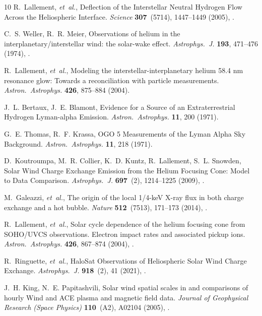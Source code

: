 \documentclass[12pt]{article}
\newcommand*\aap{Astron.~Astrophys.}
\newcommand*\apj{Astrophys.~J.}
\newcommand*\nat{Nature}
\begin{document}
\begin{thebibliography}{10}
R.~{Lallement}, \emph{et~al.}, {Deflection of the Interstellar Neutral Hydrogen
  Flow Across the Heliospheric Interface}. \emph{Science} \textbf{307}~(5714),
  1447--1449 (2005), .

C.~S. {Weller}, R.~R. {Meier}, {Observations of helium in the
  interplanetary/interstellar wind: the solar-wake effect.} \emph{\apj}
  \textbf{193}, 471--476 (1974), .

R.~{Lallement}, \emph{et~al.}, {Modeling the interstellar-interplanetary helium
  58.4 nm resonance glow: Towards a reconciliation with particle measurements.}
  \emph{\aap} \textbf{426}, 875--884 (2004).

J.~L. {Bertaux}, J.~E. {Blamont}, {Evidence for a Source of an Extraterrestrial
  Hydrogen Lyman-alpha Emission}. \emph{\aap} \textbf{11}, 200 (1971).

G.~E. {Thomas}, R.~F. {Krassa}, {OGO 5 Measurements of the Lyman Alpha Sky
  Background}. \emph{\aap} \textbf{11}, 218 (1971).

D.~{Koutroumpa}, M.~R. {Collier}, K.~D. {Kuntz}, R.~{Lallement}, S.~L.
  {Snowden}, {Solar Wind Charge Exchange Emission from the Helium Focusing
  Cone: Model to Data Comparison}. \emph{\apj} \textbf{697}~(2), 1214--1225
  (2009), .

M.~{Galeazzi}, \emph{et~al.}, {The origin of the local 1/4-keV X-ray flux in
  both charge exchange and a hot bubble}. \emph{\nat} \textbf{512}~(7513),
  171--173 (2014), .

R.~{Lallement}, \emph{et~al.}, {Solar cycle dependence of the helium focusing
  cone from SOHO/UVCS observations. Electron impact rates and associated pickup
  ions}. \emph{\aap} \textbf{426}, 867--874 (2004),
  .

R.~{Ringuette}, \emph{et~al.}, {HaloSat Observations of Heliospheric Solar Wind
  Charge Exchange}. \emph{\apj} \textbf{918}~(2), 41 (2021),
  .

J.~H. {King}, N.~E. {Papitashvili}, {Solar wind spatial scales in and
  comparisons of hourly Wind and ACE plasma and magnetic field data}.
  \emph{Journal of Geophysical Research (Space Physics)} \textbf{110}~(A2),
  A02104 (2005), .


\end{thebibliography}
\end{document}
